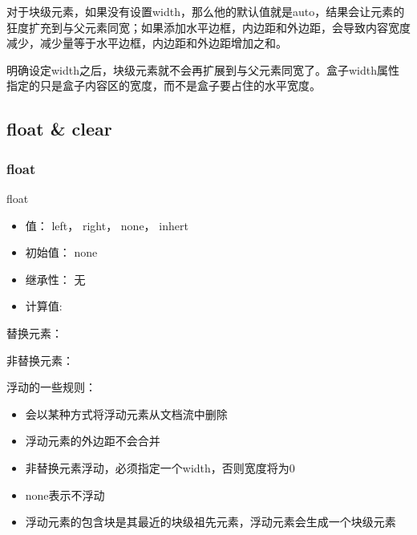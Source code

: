 对于块级元素，如果没有设置width，那么他的默认值就是auto，结果会让元素的狂度扩充到与父元素同宽；如果添加水平边框，内边距和外边距，会导致内容宽度减少，减少量等于水平边框，内边距和外边距增加之和。

明确设定width之后，块级元素就不会再扩展到与父元素同宽了。盒子width属性指定的只是盒子内容区的宽度，而不是盒子要占住的水平宽度。


\subsection{float \& clear}

\subsubsection{float}

float
\begin{itemize}
\item 值： left， right， none， inhert
\item 初始值： none
\item 继承性： 无
\item 计算值: 
\end{itemize}

替换元素： 

非替换元素：

浮动的一些规则：
\begin{itemize}

\item 会以某种方式将浮动元素从文档流中删除

\item 浮动元素的外边距不会合并

\item 非替换元素浮动，必须指定一个width，否则宽度将为0

\item none表示不浮动

\item 浮动元素的包含块是其最近的块级祖先元素，浮动元素会生成一个块级元素

\end{itemize}


